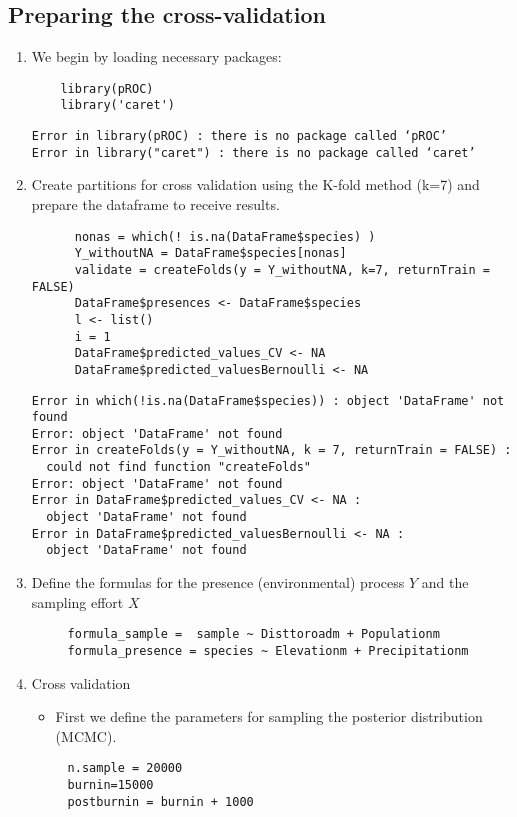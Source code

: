 \documentclass[11pt]{article}
\begin{document}
\subsection{Preparing the cross-validation}
\label{sec:org7d03720}
\begin{enumerate}
\item We begin by loading necessary packages:
\begin{verbatim}
    library(pROC)
    library('caret')
\end{verbatim}

\begin{verbatim}
Error in library(pROC) : there is no package called ‘pROC’
Error in library("caret") : there is no package called ‘caret’
\end{verbatim}

\item Create partitions for cross validation using the K-fold method (k=7) and prepare the dataframe to receive results.
\begin{verbatim}
      nonas = which(! is.na(DataFrame$species) )
      Y_withoutNA = DataFrame$species[nonas]
      validate = createFolds(y = Y_withoutNA, k=7, returnTrain = FALSE)
      DataFrame$presences <- DataFrame$species
      l <- list()
      i = 1
      DataFrame$predicted_values_CV <- NA
      DataFrame$predicted_valuesBernoulli <- NA
\end{verbatim}

\begin{verbatim}
Error in which(!is.na(DataFrame$species)) : object 'DataFrame' not found
Error: object 'DataFrame' not found
Error in createFolds(y = Y_withoutNA, k = 7, returnTrain = FALSE) : 
  could not find function "createFolds"
Error: object 'DataFrame' not found
Error in DataFrame$predicted_values_CV <- NA : 
  object 'DataFrame' not found
Error in DataFrame$predicted_valuesBernoulli <- NA : 
  object 'DataFrame' not found
\end{verbatim}

\item Define the formulas for the presence (environmental) process \(Y\) and the sampling effort \(X\)
\begin{verbatim}
     formula_sample =  sample ~ Disttoroadm + Populationm
     formula_presence = species ~ Elevationm + Precipitationm
\end{verbatim}

\item Cross validation
\begin{itemize}
\item First we define the parameters for sampling the posterior distribution (MCMC).
\end{itemize}
\begin{verbatim}
     n.sample = 20000
     burnin=15000
     postburnin = burnin + 1000
\end{verbatim}


\end{enumerate}
\end{document}
